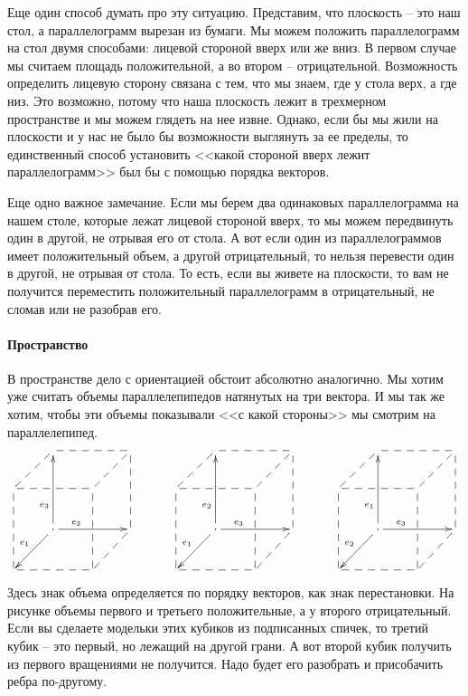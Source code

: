 Еще один способ думать про эту ситуацию.
Представим, что плоскость -- это наш стол, а параллелограмм вырезан из бумаги.
Мы можем положить параллелограмм на стол двумя способами: лицевой стороной вверх или же вниз.
В первом случае мы считаем площадь положительной, а во втором -- отрицательной.
Возможность определить лицевую сторону связана с тем, что мы знаем, где у стола верх, а где низ.
Это возможно, потому что наша плоскость лежит в трехмерном пространстве и мы можем глядеть на нее извне.
Однако, если бы мы жили на плоскости и у нас не было бы возможности выглянуть за ее пределы, то единственный способ установить <<какой стороной вверх лежит параллелограмм>> был бы с помощью порядка векторов.

Еще одно важное замечание.
Если мы берем два одинаковых параллелограмма на нашем столе, которые лежат лицевой стороной вверх, то мы можем передвинуть один в другой, не отрывая его от стола.
А вот если один из параллелограммов имеет положительный объем, а другой отрицательный, то нельзя перевести один в другой, не отрывая от стола.
То есть, если вы живете на плоскости, то вам не получится переместить положительный параллелограмм в отрицательный, не сломав или не разобрав его.

\paragraph{Пространство}

В пространстве дело с ориентацией обстоит абсолютно аналогично.
Мы хотим уже считать объемы параллелепипедов натянутых на три вектора.
И мы так же хотим, чтобы эти объемы показывали <<с какой стороны>> мы смотрим на параллелепипед.
\[
\xymatrix{
	{}&{}\ar@{--}[rr]\ar@{--}[dl]&{}&{}\ar@{--}[dl]\\
	{}\ar@{--}[rr]&{}&{}&{}\\
	{}&{\cdot}\ar[uu]^(.3){e_3}\ar[rr]^(.3){e_2}\ar[dl]_{e_1}&{}&{}\ar@{--}[dl]\ar@{--}[uu]\\
	{}\ar@{--}[rr]\ar@{--}[uu]&{}&{}\ar@{--}[uu]&{}\\
}
\quad\quad\quad
\xymatrix{
	{}&{}\ar@{--}[rr]\ar@{--}[dl]&{}&{}\ar@{--}[dl]\\
	{}\ar@{--}[rr]&{}&{}&{}\\
	{}&{\cdot}\ar[uu]^(.3){e_2}\ar[rr]^(.3){e_3}\ar[dl]_{e_1}&{}&{}\ar@{--}[dl]\ar@{--}[uu]\\
	{}\ar@{--}[rr]\ar@{--}[uu]&{}&{}\ar@{--}[uu]&{}\\
}
\quad\quad\quad
\xymatrix{
	{}&{}\ar@{--}[rr]\ar@{--}[dl]&{}&{}\ar@{--}[dl]\\
	{}\ar@{--}[rr]&{}&{}&{}\\
	{}&{\cdot}\ar[uu]^(.3){e_1}\ar[rr]^(.3){e_3}\ar[dl]_{e_2}&{}&{}\ar@{--}[dl]\ar@{--}[uu]\\
	{}\ar@{--}[rr]\ar@{--}[uu]&{}&{}\ar@{--}[uu]&{}\\
}
\]
Здесь знак объема определяется по порядку векторов, как знак перестановки.
На рисунке объемы первого и третьего положительные, а у второго отрицательный.
Если вы сделаете модельки этих кубиков из подписанных спичек, то третий кубик -- это первый, но лежащий на другой грани.
А вот второй кубик получить из первого вращениями не получится.
Надо будет его разобрать и присобачить ребра по-другому. 

